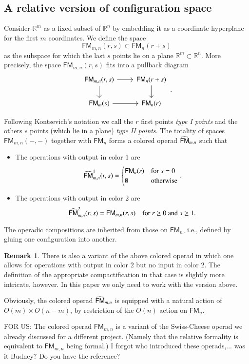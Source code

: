 \documentclass[a4paper]{amsart}
\theoremstyle{plain}
\theoremstyle{definition}
\newtheorem{rem}{Remark}
\newcommand{\R}{{\mathbb{R}}}
\newcommand{\FM}{\mathsf{FM}}
\begin{document}
\subsection{A relative version of configuration space}
Consider $\R^m$ as a fixed subset of $\R^n$ by embedding it as a coordinate hyperplane for the first $m$ coordinates.
We define the space 
\[
\FM_{m,n}(r,s) \subset \FM_n(r+s) 
\]
as the subspace for which the last $s$ points lie on a plane $\R^m\subset \R^n$.
More precisely, the space $\FM_{m,n}(r,s)$ fits into a pullback diagram
\[
 \begin{tikzcd}
\FM_{m,n}(r,s) \ar{r}\ar{d} & \FM_n(r+s) \ar{d} \\
\FM_m(s) \ar{r} & \FM_n(r)
 \end{tikzcd}\, .
\]

Following Kontsevich's notation we call the $r$ first points \emph{type I points} and the others $s$ points (which lie in a plane) \emph{type II points}.
The totality of spaces $\FM_{m,n}(-,-)$ together with $\FM_n$ forms a colored operad $\hFM_{m,n}$ such that
\begin{itemize} 
\item The operations with output in color 1 are
\[
\hFM_{m,n}^1(r,s)=
\begin{cases}
\FM_n(r) & \text{for $s=0$} \\
\emptyset & \text{otherwise} 
\end{cases}.
\]
\item The operations with output in color 2 are
\[
\hFM_{m,n}^2(r,s)=
\FM_{m,n}(r,s) \quad \text{for $r\geq 0$ and $s\geq 1$}.
\]
\end{itemize}
The operadic compositions are inherited from those on $\FM_n$, i.e., defined by gluing one configuration into another.

\begin{rem}
There is also a variant of the above colored operad in which one allows for operations with output in color 2 but no input in color 2.
The definition of the appropriate compactification in that case is slightly more intricate, however. In this paper we only need to work with the version above.
\end{rem}

Obviously, the colored operad $\hFM_{m,n}$ is equipped with a natural action of $O(m)\times O(n-m)$, by restriction of the $O(n)$ action on $\FM_n$.



FOR US: The colored operad $\FM_{m,n}$ is a variant of the Swiss-Cheese operad we already discussed for a different project. (Namely that the relative formality is equivalent to $\FM_{m,n}$ being formal.) I forgot who introduced these operads,... was it Budney? Do you have the reference?
\end{document}
